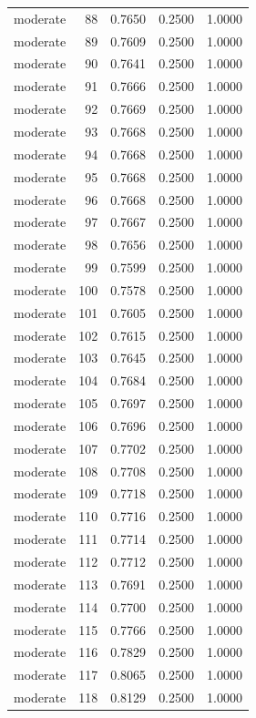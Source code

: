 \begin{tabular}{lrrrr}
moderate & 88 & 0.7650 & 0.2500 & 1.0000 \\
moderate & 89 & 0.7609 & 0.2500 & 1.0000 \\
moderate & 90 & 0.7641 & 0.2500 & 1.0000 \\
moderate & 91 & 0.7666 & 0.2500 & 1.0000 \\
moderate & 92 & 0.7669 & 0.2500 & 1.0000 \\
moderate & 93 & 0.7668 & 0.2500 & 1.0000 \\
moderate & 94 & 0.7668 & 0.2500 & 1.0000 \\
moderate & 95 & 0.7668 & 0.2500 & 1.0000 \\
moderate & 96 & 0.7668 & 0.2500 & 1.0000 \\
moderate & 97 & 0.7667 & 0.2500 & 1.0000 \\
moderate & 98 & 0.7656 & 0.2500 & 1.0000 \\
moderate & 99 & 0.7599 & 0.2500 & 1.0000 \\
moderate & 100 & 0.7578 & 0.2500 & 1.0000 \\
moderate & 101 & 0.7605 & 0.2500 & 1.0000 \\
moderate & 102 & 0.7615 & 0.2500 & 1.0000 \\
moderate & 103 & 0.7645 & 0.2500 & 1.0000 \\
moderate & 104 & 0.7684 & 0.2500 & 1.0000 \\
moderate & 105 & 0.7697 & 0.2500 & 1.0000 \\
moderate & 106 & 0.7696 & 0.2500 & 1.0000 \\
moderate & 107 & 0.7702 & 0.2500 & 1.0000 \\
moderate & 108 & 0.7708 & 0.2500 & 1.0000 \\
moderate & 109 & 0.7718 & 0.2500 & 1.0000 \\
moderate & 110 & 0.7716 & 0.2500 & 1.0000 \\
moderate & 111 & 0.7714 & 0.2500 & 1.0000 \\
moderate & 112 & 0.7712 & 0.2500 & 1.0000 \\
moderate & 113 & 0.7691 & 0.2500 & 1.0000 \\
moderate & 114 & 0.7700 & 0.2500 & 1.0000 \\
moderate & 115 & 0.7766 & 0.2500 & 1.0000 \\
moderate & 116 & 0.7829 & 0.2500 & 1.0000 \\
moderate & 117 & 0.8065 & 0.2500 & 1.0000 \\
moderate & 118 & 0.8129 & 0.2500 & 1.0000 \\

\end{tabular}
